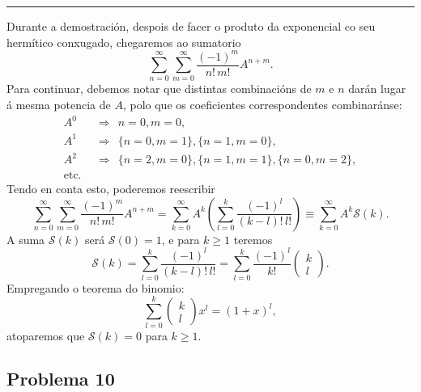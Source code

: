 \documentclass[a4paper,12pt]{article}
\begin{document}
\begin{center} \hrule \end{center}

Durante a demostración, despois de facer o produto da exponencial co seu hermítico conxugado, chegaremos ao sumatorio
\begin{equation}
	\sum_{n=0}^\infty \sum_{m=0}^\infty \frac{(-1)^m}{n! \, m!} A^{n+m}.
\end{equation}
\noindent
Para continuar, debemos notar que distintas combinacións de $m$ e $n$ darán lugar á mesma potencia de $A$, polo que os coeficientes correspondentes combinaránse:
\begin{equation}
\begin{split}
	A^0 &~~ \Longrightarrow ~~ n=0, m=0, \\
	A^1 &~~ \Longrightarrow ~~ \{n=0, m=1\}, \{n=1,m=0\}, \\
	A^2 &~~ \Longrightarrow ~~ \{n=2,m=0\}, \{n=1,m=1\},\{n=0,m=2\}, \\
	\mathrm{etc}.
\end{split}
\end{equation} 
\noindent
Tendo en conta esto, poderemos reescribir
\begin{equation}
	\sum_{n=0}^\infty \sum_{m=0}^\infty \frac{(-1)^m}{n! \, m!} A^{n+m} = \sum_{k=0}^\infty A^k \left ( \sum_{l=0}^k \frac{(-1)^l}{(k-l)! \, l!} \right) \equiv \sum_{k=0}^\infty A^k \mathcal{S}(k).
\end{equation}
\noindent
A suma $\mathcal{S}(k)$ será $\mathcal{S}(0) = 1$, e para $k \geq 1$ teremos
\begin{equation}
	\mathcal{S}(k) = \sum_{l=0}^k \frac{(-1)^l}{(k-l)! \, l!} = \sum_{l=0}^k \frac{(-1)^l}{k!} \begin{pmatrix} k \\ l \end{pmatrix}.
\end{equation}
\noindent
Empregando o teorema do binomio:
\begin{equation}
	\sum_{l=0}^k \begin{pmatrix} k \\ l \end{pmatrix} x^l = (1+x)^l,
\end{equation}
\noindent
atoparemos que $\mathcal{S}(k) = 0$ para $k \geq 1$.

\subsection*{Problema 10}
\end{document}
